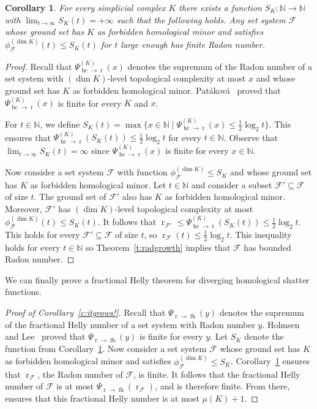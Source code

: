 \documentclass[a4paper,UKenglish,thm-restate]{article}
\newcommand{\N}{\mathbb{N}}
\newcommand{\F}{\mathcal{F}}
\DeclareMathOperator{\rad}{r}
\DeclareMathOperator{\fh}{fh}
\DeclareMathOperator{\hc}{hc}
\newtheorem{corollary}[theorem]{Corollary}
\begin{document}
\begin{corollary}\label{c:Patakova+}
  For every simplicial complex $K$ there exists a function $S_K : \N \to \N$ with $\lim_{t \to \infty} S_K(t) = +\infty$ such that the following holds. Any set system $\F$ whose ground set has $K$ as forbidden homological minor and satisfies $\phi_{\F}^{(\dim K)}(t) \le S_K(t)$ for $t$ large enough has finite Radon number.  
\end{corollary}
\begin{proof}
  Recall that $\Psi^{(K)}_{\hc \to \rad}(x)$ denotes the supremum of the Radon number of a set system with $(\dim K)$-level topological complexity at most $x$ and whose ground set has $K$ as forbidden homological minor. Patáková~\cite{patakova2022bounding} proved that $\Psi^{(K)}_{\hc \to \rad}(x)$ is finite for every $K$ and $x$.

  \medskip

  For $t \in \N$, we define $S_K(t) =\max\{x\in\N\mid \Psi^{(K)}_{\hc \to \rad}(x) \le \frac12 \log_2 t\}$. This ensures that $\Psi^{(K)}_{\hc \to \rad}(S_K(t)) \le \frac12 \log_2 t$ for every $t \in \N$.    Observe that $\lim_{t \to \infty} S_K(t) = \infty$ since $\Psi^{(K)}_{\hc \to \rad}(x)$ is finite for every $x \in \N$.

  \medskip

  Now consider a set system $\F$ with function $\phi_{\F}^{(\dim K)} \le S_K$ and whose ground set has $K$ as forbidden homological minor. Let $t \in \N$ and consider a subset $\F' \subseteq \F$ of size $t$. The ground set of $\F'$ also has $K$ as forbidden homological minor. Moreover, $\F'$ has  $(\dim K)$-level topological complexity at most $\phi_{\F}^{(\dim K)}(t) \le S_K(t)$. It follows that $\rad_{\F'} \le \Psi^{(K)}_{\hc \to \rad}(S_K(t)) \le \frac12 \log_2 t$. This holds for every $\F' \subseteq \F$ of size $t$, so $\rad_\F(t) \le \frac12 \log_2 t$. This inequality holds for every $t \in \N$ so Theorem~\ref{t:radgrowth} implies that $\F$ has bounded Radon number.
\end{proof}

\noindent
We can finally prove a fractional Helly theorem for diverging homological shatter functions.

\begin{proof}[Proof of Corollary~\ref{c:itgrows!}]
  Recall that $\Psi_{\rad \to \fh}(y)$ denotes the supremum of the fractional Helly number of a set system with Radon number $y$. Holmsen and Lee~\cite[Theorem~1.1]{Holmsen2021} proved that $\Psi_{\rad \to \fh}(y)$ is finite for every $y$. Let $S_K$ denote the function from Corollary~\ref{c:Patakova+}. Now consider a set system $\F$ whose ground set has $K$ as forbidden homological minor and satisfies $\phi_{\F}^{(\dim K)} \le S_K$. Corollary~\ref{c:Patakova+} ensures that $\rad_\F$, the Radon number of $\F$, is finite. It follows that the fractional Helly number of $\F$ is at most $\Psi_{\rad \to \fh}(\rad_\F)$, and is therefore finite. From there, \cite[Theorem~1.2]{steppingUp} ensures that this fractional Helly number is at most $\mu(K)+1$.
\end{proof}
\end{document}
